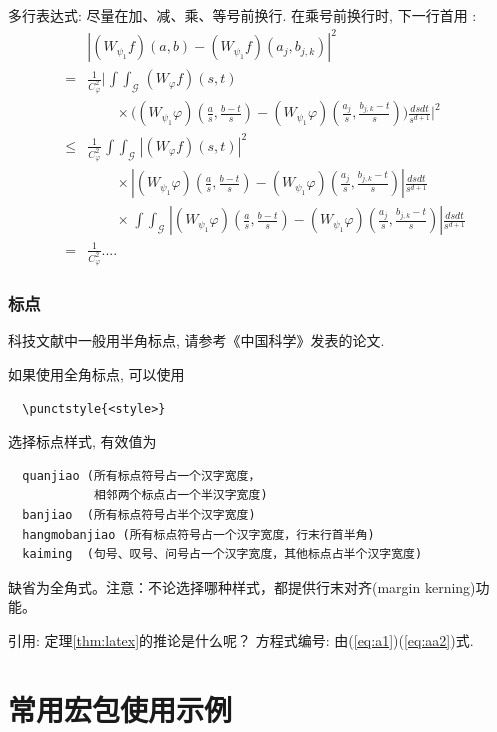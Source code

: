 \documentclass{nktba}
\begin{document}
多行表达式: 尽量在加、减、乘、等号前换行. 在乘号前换行时,
下一行首用 \string\times:
\def\iint{\mathop{\int\!\!\!\int}}\def\calG{\mathcal G}
\begin{eqnarray}
&&\left|(W_{\psi_1}f)(a,b)-(W_{\psi_1}f)(a_j,b_{j,k})\right|^{2}\nonumber\\
&=&\frac{1}{C^{2}_{\varphi}}\Bigg|\iint_{\calG} (W_{\varphi}f)(s,t) \nonumber\\
&&\qquad\times \Bigg( (W_{\psi_1}\varphi)\left(\frac{a}{s},
\frac{b-t}{s}\right)
     -(W_{\psi_1}\varphi)\left(\frac{a_{j}}{s}, \frac{b_{j,k}-t}{s}\right)\Bigg)
  \frac{dsdt}{s^{d+1}}\Bigg|^2 \nonumber\\
&\le& \frac{1}{C^2_{\varphi}} \iint_{\calG} |(W_{\varphi}f)(s,t)|^2 \nonumber\\
&&\qquad \times\left| (W_{\psi_1}\varphi)\left(\frac{a}{s},
\frac{b-t}{s}\right)
    -(W_{\psi_1}\varphi)\left(\frac{a_{j}}{s}, \frac{b_{j,k}-t}{s}\right)\right|
   \frac{dsdt}{s^{d+1}}  \nonumber\\
&&\qquad \times   \iint_{\calG}\!
 \left|(W_{\psi_1}\varphi)\left(\frac{a}{s}, \frac{b-t}{s}\right)
    -(W_{\psi_1}\varphi)\left(\frac{a_{j}}{s}, \frac{b_{j,k}-t}{s}\right)\right|
 \frac{ ds dt}{s^{d+1}} \nonumber\\
&=& \frac{1}{C^2_{\varphi}} ....  \label{eq:a0}
\end{eqnarray}


\subsubsection{标点}
科技文献中一般用半角标点, 请参考《中国科学》发表的论文.

如果使用全角标点, 可以使用
\begin{verbatim}
  \punctstyle{<style>}
\end{verbatim}
选择标点样式, 有效值为
\begin{verbatim}
  quanjiao (所有标点符号占一个汉字宽度，
            相邻两个标点占一个半汉字宽度)
  banjiao  (所有标点符号占半个汉字宽度)
  hangmobanjiao (所有标点符号占一个汉字宽度，行末行首半角)
  kaiming  (句号、叹号、问号占一个汉字宽度，其他标点占半个汉字宽度)
\end{verbatim}
缺省为全角式。注意：不论选择哪种样式，都提供行末对齐(margin kerning)功能。


引用:   定理\ref{thm:latex}的推论是什么呢？
方程式编号:  由(\ref{eq:a1})(\ref{eq:aa2})式.

\section{常用宏包使用示例}
\end{document}
